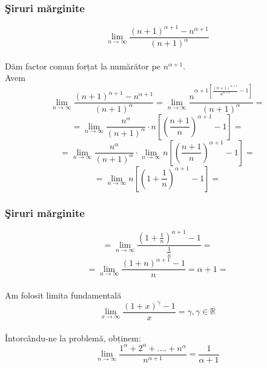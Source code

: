 \documentclass{beamer}
\theoremstyle{plain}
\begin{document}
\frame
{
\frametitle{\c Siruri m\u arginite}
\begin{displaymath}
 \lim_{n \to \infty }\frac{\left ( n+1 \right )^{\alpha +1}-n^{\alpha +1}}{\left ( n+1 \right )^{\alpha }}
\end{displaymath}
\\ Dăm factor comun forțat la numărător pe \(n^{\alpha +1}\). 
\\ Avem 
\begin{displaymath}
 \lim_{n \to \infty }\frac{\left ( n+1 \right )^{\alpha +1}-n^{\alpha +1}}{\left ( n+1 \right )^{\alpha }} = \lim_{n \to \infty }\frac{n^{\alpha +1\left [ \frac{\left ( n+1 \right )^{\alpha +1}}{n^{\alpha +1}} -1\right ]}}{\left ( n+1 \right )^{\alpha }} = 
\end{displaymath}
\begin{displaymath}
 = \lim_{n \to \infty }\frac{n^{\alpha }}{\left ( n+1 \right )^{\alpha }}\cdot n\left [ \left ( \frac{n+1}{n} \right )^{\alpha +1}-1 \right ] = 
\end{displaymath}
\begin{displaymath}
 =\lim_{n \to \infty }\frac{n^{\alpha }}{\left ( n+1 \right )^{\alpha }}\cdot \lim_{n \to \infty }n\left [ \left ( \frac{n+1}{n} \right )^{\alpha +1} -1\right ]=
\end{displaymath}
\begin{displaymath}
 =\lim_{n \to \infty }n\left [ \left ( 1+\frac{1}{n} \right )^{\alpha +1}-1 \right ]= 
\end{displaymath}
}
\frame
{
\frametitle{\c Siruri m\u arginite}
\begin{displaymath}
 = \lim_{n \to \infty }\frac{\left ( 1+\frac{1}{n} \right )^{\alpha +1}-1}{\frac{1}{n}}=
\end{displaymath}
\begin{displaymath}
 =\lim_{n \to \infty }\frac{\left ( 1+n \right )^{\alpha +1}-1}{n}= \alpha +1=
\end{displaymath}
\\ Am folosit limita fundamentală 
\begin{displaymath}
 \lim_{x \to \infty }\frac{\left ( 1+x \right )^{\gamma }-1}{x} = \gamma ,\gamma \in \mathbb{R}
\end{displaymath}
\\ Întorcându-ne la problemă, obținem:
\begin{displaymath}
 \lim_{n \to \infty }\frac{1^{\alpha }+2^{\alpha }+....+n^{\alpha }}{n^{\alpha +1}} = \frac{1}{\alpha +1}
\end{displaymath}
}
\end{document}
